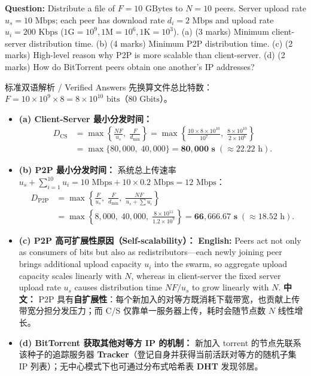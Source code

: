 
\textbf{Question:} Distribute a file of $F = 10\text{ GBytes}$ to $N = 10$ peers. Server upload rate $u_s = 10\text{ Mbps}$; each peer has download rate $d_i = 2\text{ Mbps}$ and upload rate $u_i = 200\text{ Kbps}$ ($1\text{G}=10^9, 1\text{M}=10^6, 1\text{K}=10^3$).
(a) (3 marks) Minimum client-server distribution time.
(b) (4 marks) Minimum P2P distribution time.
(c) (2 marks) High-level reason why P2P is more scalable than client-server.
(d) (2 marks) How do BitTorrent peers obtain one another's IP addresses?

\begin{StudySolution}{标准双语解析 / Verified Answers}
先换算文件总比特数：$F = 10 \times 10^9 \times 8 = 8 \times 10^{10}\text{ bits}$（$80\text{ Gbits}$）。
\begin{itemize}
\item \textbf{(a) Client-Server 最小分发时间：}
  \[
  \begin{aligned}
  D_{\text{CS}} &= \max\!\left\{\frac{NF}{u_s},\; \frac{F}{d_{\min}}\right\}
  = \max\!\left\{\frac{10\times 8\times 10^{10}}{10^7},\; \frac{8\times 10^{10}}{2\times 10^6}\right\} \\
  &= \max\{80{,}000,\; 40{,}000\} = \mathbf{80{,}000\text{ s}} \;(\approx 22.22\text{ h}).
  \end{aligned}
  \tag{F.3}
  \]
\item \textbf{(b) P2P 最小分发时间：} 系统总上传速率 $u_s + \sum_{i=1}^{10} u_i = 10\text{ Mbps} + 10\times 0.2\text{ Mbps} = 12\text{ Mbps}$：
  \[
  \begin{aligned}
  D_{\text{P2P}} &= \max\!\left\{\frac{F}{u_s},\; \frac{F}{d_{\min}},\; \frac{NF}{u_s + \sum u_i}\right\} \\
  &= \max\!\left\{8{,}000,\; 40{,}000,\; \frac{8\times 10^{11}}{1.2\times 10^7}\right\}
  = \mathbf{66{,}666.67\text{ s}} \;(\approx 18.52\text{ h}).
  \end{aligned}
  \tag{F.4}
  \]
\item \textbf{(c) P2P 高可扩展性原因（Self-scalability）：}
  \textbf{English:} Peers act not only as consumers of bits but also as redistributors—each newly joining peer brings additional upload capacity $u_i$ into the swarm, so aggregate upload capacity scales linearly with $N$, whereas in client-server the fixed server upload rate $u_s$ causes distribution time $NF/u_s$ to grow linearly with $N$.
  \textbf{中文：} P2P 具有\textbf{自扩展性}：每个新加入的对等方既消耗下载带宽，也贡献上传带宽分担分发压力；而 C/S 仅靠单一服务器上传，耗时会随节点数 $N$ 线性增长。
\item \textbf{(d) BitTorrent 获取其他对等方 IP 的机制：}
  新加入 torrent 的节点先联系该种子的追踪服务器 \textbf{Tracker}（登记自身并获得当前活跃对等方的随机子集 IP 列表）；无中心模式下也可通过分布式哈希表 \textbf{DHT} 发现邻居。
\end{itemize}
\end{StudySolution}


